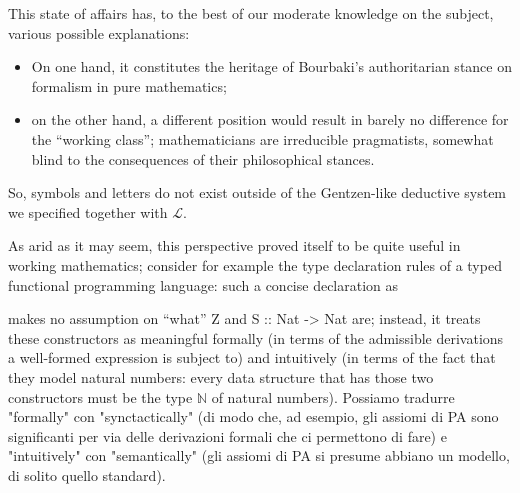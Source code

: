 \documentclass[a4paper, 11pt]{article}
\newcommand{\numberset}{\mathbb}
\newcommand{\N}{\numberset{N}}
\begin{document}
	This state of affairs has, to the best of our moderate knowledge on the subject, various possible explanations:
	\begin{itemize}
		\item On one hand, it constitutes the heritage of Bourbaki's authoritarian stance on formalism in pure mathematics;
		\item on the other hand, a different position would result in barely no difference for the ``working class''; mathematicians are irreducible pragmatists, somewhat blind to the consequences of their philosophical stances.
	\end{itemize}
	So, symbols and letters do not exist outside of the Gentzen-like deductive system we specified together with $\mathcal{L}$.
	
	As arid as it may seem, this perspective proved itself to be quite useful in working mathematics; consider for example the type declaration rules of a typed functional programming language: such a concise declaration as
	

\endde 
	
	makes no assumption on ``what'' Z and S :: Nat -> Nat are; instead, it treats these constructors as meaningful formally (in terms of the admissible derivations a well-formed expression is subject to) and intuitively (in terms of the fact that they model natural numbers: every data structure that has those two constructors must be the type $\N$ of natural numbers).
	Possiamo tradurre "formally" con "synctactically" (di modo che, ad esempio, gli assiomi di PA sono significanti per via delle derivazioni formali che ci permettono di fare) e "intuitively" con "semantically" (gli assiomi di PA si presume abbiano un modello, di solito quello standard). 
	
\end{document}
